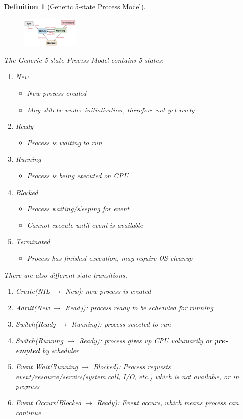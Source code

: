 \documentclass[11pt]{article}
\newtheorem{definition}{Definition}[section]
\theoremstyle{definition}
\begin{document}
\begin{definition}[Generic 5-state Process Model]
\begin{figure}[h]
\centering
\includegraphics[width=0.25\textwidth]{2_3.png}
\end{figure}
\normalfont The Generic 5-state Process Model contains 5 states:
\begin{enumerate}
  \item New
  \begin{itemize}[itemsep=0pt]
    \item New process created
    \item May still be under initialisation, therefore \textit{not yet} ready
  \end{itemize}
  \item Ready
  \begin{itemize}[itemsep=0pt]
    \item Process is waiting to run
  \end{itemize}
  \item Running
  \begin{itemize}[itemsep=0pt]
    \item Process is being executed on CPU
  \end{itemize}
  \item Blocked
  \begin{itemize}[itemsep=0pt]
    \item Process waiting/sleeping for event
    \item Cannot execute until event is available
  \end{itemize}
  \item Terminated
  \begin{itemize}[itemsep=0pt]
    \item Process has finished execution, may require OS cleanup
  \end{itemize}
\end{enumerate}
There are also different state transitions,
\begin{enumerate}
  \item Create(NIL $\to$ New): new process is created
  \item Admit(New $\to$ Ready): process ready to be scheduled for running
  \item Switch(Ready $\to$ Running): process selected to run
  \item Switch(Running $\to$ Ready): process gives up CPU voluntarily or \textbf{pre-empted} by scheduler
  \item Event Wait(Running $\to$ Blocked): Process requests event/resource/service(system call, I/O, etc.) which is not available, or in progress
  \item Event Occurs(Blocked $\to$ Ready): Event occurs, which means process can continue
\end{enumerate}
\end{definition} 
\end{document}
